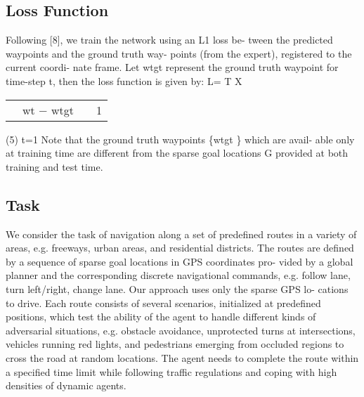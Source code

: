 \documentclass[letterpaper, 12pt]{article}
\theoremstyle{definition}
\theoremstyle{definition}
\theoremstyle{definition}
\theoremstyle{definition}
\theoremstyle{definition}
\begin{document}
\subsection{Loss Function}
\label{sec:orgcd8cda3}
Following [8], we train the network using an L1 loss be-
tween the predicted waypoints and the ground truth way-
points (from the expert), registered to the current coordi-
nate frame. Let wtgt represent the ground truth waypoint for time-step t, then the loss function is given by:
L=
T
X
\begin{center}
\begin{tabular}{lllr}
 & wt − wtgt &  & 1\\
\end{tabular}
\end{center}
(5)
t=1
Note that the ground truth waypoints \{wtgt \} which are avail-
able only at training time are different from the sparse goal
locations G provided at both training and test time.

\subsection{Task}
\label{sec:org8d1d8e8}
We consider the task of navigation along a set of
predefined routes in a variety of areas, e.g. freeways, urban
areas, and residential districts. The routes are defined by a
sequence of sparse goal locations in GPS coordinates pro-
vided by a global planner and the corresponding discrete
navigational commands, e.g. follow lane, turn left/right,
change lane. Our approach uses only the sparse GPS lo-
cations to drive. Each route consists of several scenarios,
initialized at predefined positions, which test the ability of
the agent to handle different kinds of adversarial situations,
e.g. obstacle avoidance, unprotected turns at intersections,
vehicles running red lights, and pedestrians emerging from
occluded regions to cross the road at random locations. The
agent needs to complete the route within a specified time
limit while following traffic regulations and coping with
high densities of dynamic agents.
\end{document}
